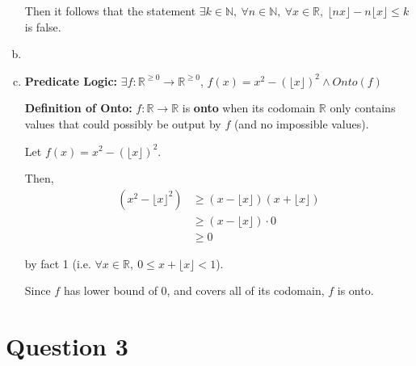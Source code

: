 \documentclass[12pt]{article}
\begin{document}
\begin{enumerate}[a.]
    \bigskip

    Then it follows that the statement $\exists k \in \mathbb{N},\:\forall n \in \mathbb{N},\:
    \forall x \in \mathbb{R},\: \lfloor nx \rfloor - n \lfloor x \rfloor \leq k$ is false.

    \item

    \item

    \textbf{Predicate Logic:} $\exists f:\mathbb{R}^{\geq 0} \to \mathbb{R}^{\geq 0}$,
    $f(x) = x^2 - (\lfloor x \rfloor)^2 \land Onto(f)$

    \textbf{Definition of Onto:} $f:\mathbb{R} \to \mathbb{R}$ is \textbf{onto}
    when its codomain $\mathbb{R}$ only contains values that could possibly be output
    by $f$ (and no impossible values).

    \bigskip

    Let $f(x) = x^2 - (\lfloor x \rfloor)^2$.

    \bigskip

    Then,
    \setcounter{equation}{0}
    \begin{align}
        (x^2 - \lfloor x \rfloor^2) &\geq (x - \lfloor x \rfloor)(x + \lfloor x \rfloor)\\
        &\geq (x - \lfloor x \rfloor) \cdot 0\\
        &\geq 0
    \end{align}

    by fact 1 (i.e. $\forall x \in \mathbb{R},\: 0 \leq x + \lfloor x \rfloor < 1$).

    \bigskip

    Since $f$ has lower bound of 0, and covers all of its codomain, $f$ is onto.

\end{enumerate}

\section*{Question 3}
\end{document}
